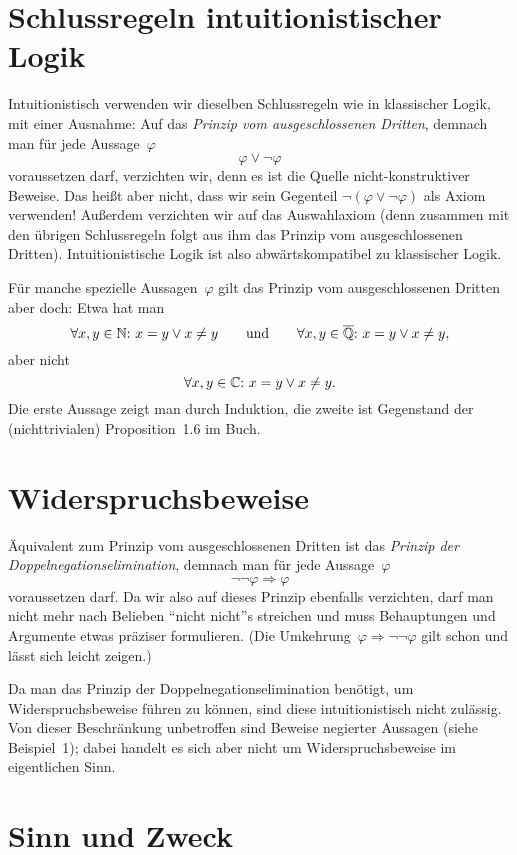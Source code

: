 \documentclass{algblatt}
\theoremstyle{plain}
\begin{document}
\section*{Schlussregeln intuitionistischer Logik}

Intuitionistisch verwenden wir dieselben Schlussregeln wie in klassischer
Logik, mit einer Ausnahme: Auf das \emph{Prinzip vom ausgeschlossenen Dritten},
demnach man für jede Aussage~$\varphi$
\[ \varphi \vee \neg\varphi \]
voraussetzen darf, verzichten wir, denn es ist die Quelle nicht-konstruktiver
Beweise.
Das heißt aber nicht, dass wir sein
Gegenteil $\neg\left(\varphi \vee \neg\varphi\right)$
als Axiom verwenden! Außerdem verzichten wir auf das Auswahlaxiom (denn
zusammen mit den übrigen Schlussregeln folgt aus ihm das Prinzip vom
ausgeschlossenen Dritten). Intuitionistische Logik ist also abwärtskompatibel
zu klassischer Logik.

Für manche spezielle Aussagen~$\varphi$ gilt das Prinzip vom ausgeschlossenen
Dritten aber doch: Etwa hat man
\[ \forall x,y \in \mathbb{N}{:}\ x = y \vee x \neq y \qquad\text{und}\qquad
  \forall x,y \in \overline{\mathbb{Q}}{:}\ x = y \vee x \neq y, \]
aber nicht
\[ \forall x,y \in \mathbb{C}{:}\ x = y \vee x \neq y. \]
Die erste Aussage zeigt man durch Induktion, die zweite ist Gegenstand der
(nichttrivialen) Proposition~1.6 im Buch.


\section*{Widerspruchsbeweise}

Äquivalent zum Prinzip vom ausgeschlossenen Dritten ist das \emph{Prinzip der
Doppelnegationselimination}, demnach man für jede Aussage~$\varphi$
\[ \neg\neg\varphi \Longrightarrow \varphi \]
voraussetzen darf. Da wir also auf dieses Prinzip ebenfalls verzichten, darf
man nicht mehr nach Belieben "`nicht nicht"'s streichen und muss Behauptungen
und Argumente etwas präziser formulieren.
(Die Umkehrung~$\varphi \Rightarrow \neg\neg\varphi$ gilt schon und lässt sich
leicht zeigen.)

Da man das Prinzip der Doppelnegationselimination benötigt, um
Widerspruchsbeweise führen zu können, sind diese intuitionistisch nicht
zulässig. Von dieser Beschränkung unbetroffen sind Beweise negierter Aussagen
(siehe Beispiel~1); dabei handelt es sich aber nicht um Widerspruchsbeweise im
eigentlichen Sinn.


\section*{Sinn und Zweck}
\end{document}
